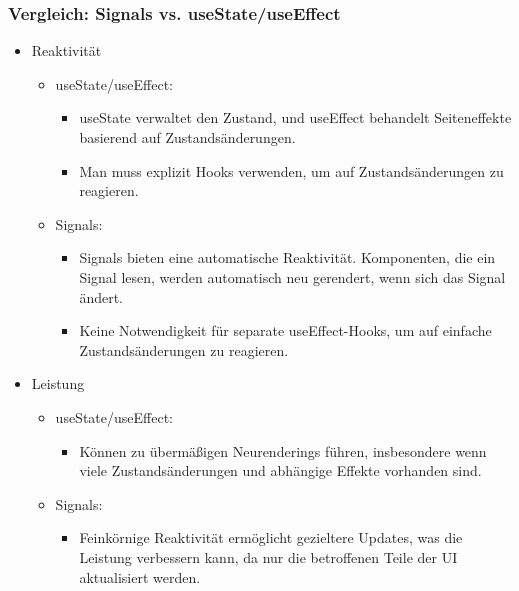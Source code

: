\documentclass[12pt,a4paper]{article} %
\begin{document}
\subsubsection{Vergleich: Signals vs. useState/useEffect} 
\begin{itemize}
 \item Reaktivität

\begin{itemize}

\item useState/useEffect:

\begin{itemize}
\item useState verwaltet den Zustand, und useEffect behandelt Seiteneffekte basierend auf Zustandsänderungen.

\item Man muss explizit Hooks verwenden, um auf Zustandsänderungen zu reagieren.

\end{itemize}

\item Signals:

\begin{itemize}

\item Signals bieten eine automatische Reaktivität. Komponenten, die ein Signal lesen, werden automatisch neu gerendert, wenn sich das Signal ändert.

\item Keine Notwendigkeit für separate useEffect-Hooks, um auf einfache Zustandsänderungen zu reagieren.

\end{itemize}
\end{itemize}


\item Leistung

\begin{itemize}

\item useState/useEffect:

\begin{itemize}
\item Können zu übermäßigen Neurenderings führen, insbesondere wenn viele Zustandsänderungen und abhängige Effekte vorhanden sind.
\end{itemize}


\item Signals:
\begin{itemize}
\item Feinkörnige Reaktivität ermöglicht gezieltere Updates, was die Leistung verbessern kann, da nur die betroffenen Teile der UI aktualisiert werden.
\end{itemize}
\end{itemize}



\end{itemize}
\end{document}
